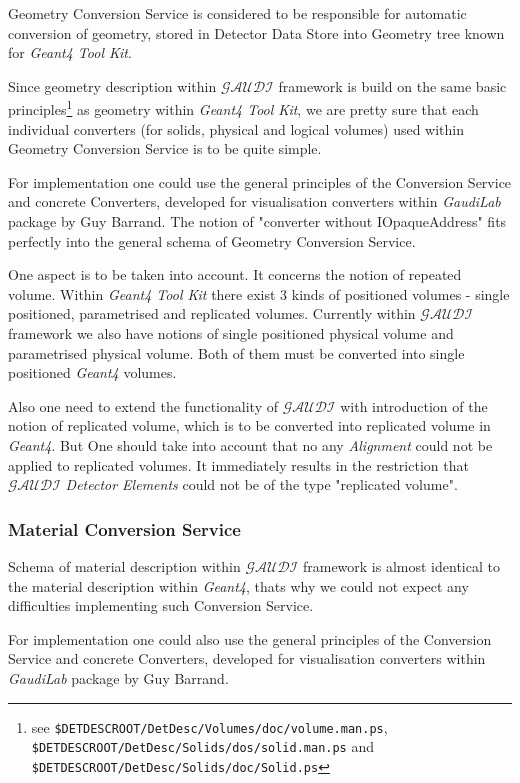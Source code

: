 \documentclass[nfss,times,12pt,a4paper]{article}
\begin{document}
Geometry Conversion Service is considered to be responsible 
for automatic conversion of geometry, stored in 
Detector Data Store into Geometry tree known for {\it Geant4 Tool Kit}. 

Since geometry description within ${\mathcal{GAUDI}}$ framework 
is build on the same basic principles\footnote{%
see {\tt \$DETDESCROOT/DetDesc/Volumes/doc/volume.man.ps}, 
{\tt \$DETDESCROOT/DetDesc/Solids/dos/solid.man.ps} and 
{\tt \$DETDESCROOT/DetDesc/Solids/doc/Solid.ps}}
as geometry within {\it Geant4 Tool Kit}, 
we are pretty sure that each individual converters
(for solids, physical and logical volumes) used within 
Geometry Conversion Service is to be quite simple.
   
For implementation one could use the general principles 
of the Conversion Service and concrete Converters, developed 
for visualisation converters within {\it GaudiLab} package
by Guy Barrand. The notion of "converter without IOpaqueAddress"
fits perfectly into the general schema of Geometry Conversion 
Service. 

One aspect is to be taken into account. It concerns the notion of 
repeated volume.    Within {\it Geant4 Tool Kit} there exist 3 
kinds of positioned volumes - single positioned, parametrised 
and replicated volumes. Currently within ${\mathcal{GAUDI}}$ framework 
we also have notions of single positioned physical volume and 
parametrised physical volume. Both of them must be converted 
into single positioned {\it Geant4} volumes. 

Also one need to extend the functionality of ${\mathcal{GAUDI}}$
with introduction of the notion of replicated volume, which is 
to be converted into replicated volume in {\it Geant4}. 
But One should take into account that no any {\it Alignment}
could not be applied to replicated volumes. It immediately results in the 
restriction that ${\mathcal{GAUDI}}$ {\it Detector Elements} 
could not be of the type "replicated volume". 

  \subsubsection{ Material      Conversion Service }

Schema of material description within ${\mathcal{GAUDI}}$ framework 
is almost identical to the material description within {\it Geant4}, 
thats why we could not expect any difficulties implementing such 
Conversion Service. 

For implementation one could also use the general principles 
of the Conversion Service and concrete Converters, developed 
for visualisation converters within {\it GaudiLab} package
by Guy Barrand.
\end{document}
